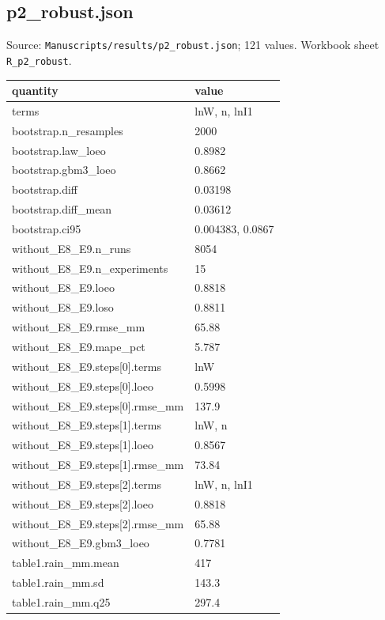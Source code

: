 \subsection*{p2\_robust.json}
\noindent\small Source: \nolinkurl{Manuscripts/results/p2_robust.json}; 121 values. Workbook sheet \texttt{R\_p2\_robust}.\par
{\scriptsize\begin{longtable}{p{}p{}}\toprule\textbf{quantity} & \textbf{value}\\\midrule\endhead
{}terms & lnW, n, lnI1\\
{}bootstrap.n\_resamples & 2000\\
{}bootstrap.law\_loeo & 0.8982\\
{}bootstrap.gbm3\_loeo & 0.8662\\
{}bootstrap.diff & 0.03198\\
{}bootstrap.diff\_mean & 0.03612\\
{}bootstrap.ci95 & 0.004383, 0.0867\\
{}without\_E8\_E9.n\_runs & 8054\\
{}without\_E8\_E9.n\_experiments & 15\\
{}without\_E8\_E9.loeo & 0.8818\\
{}without\_E8\_E9.loso & 0.8811\\
{}without\_E8\_E9.rmse\_mm & 65.88\\
{}without\_E8\_E9.mape\_pct & 5.787\\
{}without\_E8\_E9.steps[0].terms & lnW\\
{}without\_E8\_E9.steps[0].loeo & 0.5998\\
{}without\_E8\_E9.steps[0].rmse\_mm & 137.9\\
{}without\_E8\_E9.steps[1].terms & lnW, n\\
{}without\_E8\_E9.steps[1].loeo & 0.8567\\
{}without\_E8\_E9.steps[1].rmse\_mm & 73.84\\
{}without\_E8\_E9.steps[2].terms & lnW, n, lnI1\\
{}without\_E8\_E9.steps[2].loeo & 0.8818\\
{}without\_E8\_E9.steps[2].rmse\_mm & 65.88\\
{}without\_E8\_E9.gbm3\_loeo & 0.7781\\
{}table1.rain\_mm.mean & 417\\
{}table1.rain\_mm.sd & 143.3\\
{}table1.rain\_mm.q25 & 297.4\\

\end{longtable}}
